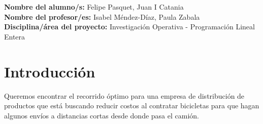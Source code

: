 \documentclass[11pt,a4paper]{article}
\begin{document}


\pagestyle{plain}


\medskip

\textbf{Nombre del alumno/s:} Felipe Pasquet, Juan I Catania \\


\textbf{Nombre del profesor/es:} Isabel Méndez-Díaz, Paula Zabala \\

\textbf{Disciplina/área del proyecto:} Investigación Operativa - Programación Lineal Entera

\section*{Introducción} {\small Queremos encontrar el recorrido óptimo para una empresa de distribución de productos que está buscando reducir costos al contratar bicicletas para que hagan algunos envíos a distancias cortas desde donde pasa el camión.}\

\end{document}
